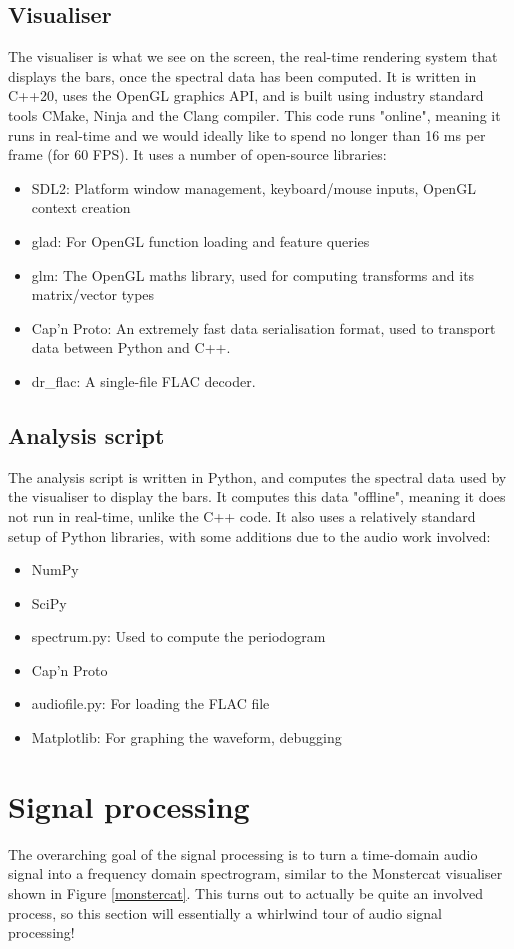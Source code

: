\documentclass[11pt]{article}
\begin{document}
\subsection{Visualiser}
The visualiser is what we see on the screen, the real-time rendering system that displays the bars, once the
spectral data has been computed. It is written in C++20, uses the OpenGL graphics API, and is built using
industry standard tools CMake, Ninja and the Clang compiler. This code runs "online", meaning it runs in
real-time and we would ideally like to spend no longer than 16 ms per frame (for 60 FPS). It uses a number of
open-source libraries:
\begin{itemize}
	\item SDL2: Platform window management, keyboard/mouse inputs, OpenGL context creation
	\item glad: For OpenGL function loading and feature queries
    \item glm: The OpenGL maths library, used for computing transforms and its matrix/vector types
    \item Cap'n Proto: An extremely fast data serialisation format, used to transport data between Python and
        C++.
    \item dr\_flac: A single-file FLAC decoder.
\end{itemize}

\subsection{Analysis script}
The analysis script is written in Python, and computes the spectral data used by the visualiser to display the
bars. It computes this data "offline", meaning it does not run in real-time, unlike the C++ code. It also uses
a relatively standard setup of Python libraries, with some additions due to the audio work involved:
\begin{itemize}
    \item NumPy
    \item SciPy
    \item spectrum.py: Used to compute the periodogram
    \item Cap'n Proto
    \item audiofile.py: For loading the FLAC file
    \item Matplotlib: For graphing the waveform, debugging
\end{itemize}

\clearpage
\section{Signal processing}
The overarching goal of the signal processing is to turn a time-domain audio signal into a frequency domain
spectrogram, similar to the Monstercat visualiser shown in Figure \ref{monstercat}. This turns out to actually
be quite an involved process, so this section will essentially a whirlwind tour of audio signal processing!
\end{document}
